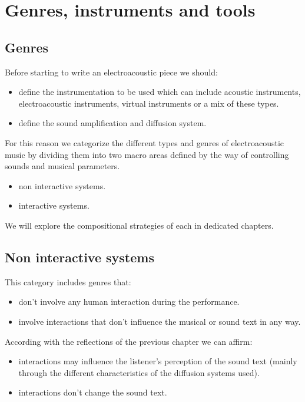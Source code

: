 \chapter{Genres, instruments and tools}

\section{Genres}\label{genres}

Before starting to write an electroacoustic piece we should:

\begin{itemize}
\tightlist\item define the instrumentation to be used which can include acoustic instruments, electroacoustic instruments, virtual instruments or a mix of these types.
\item define the sound amplification and diffusion system.
\end{itemize}

For this reason we categorize the different types and genres of electroacoustic music by dividing them into two macro areas defined by the way of controlling sounds and musical parameters.

\begin{itemize}
\tightlist\item non interactive systems.
\item interactive systems.
\end{itemize}

We will explore the compositional strategies of each in dedicated chapters.

\section{Non interactive systems}\label{non-interactive-systems}

This category includes genres that:

\begin{itemize}
\tightlist\item don't involve any human interaction during the performance.
\item involve interactions that don't influence the musical or sound text in any way.
\end{itemize}

According with the reflections of the previous chapter we can affirm:

\begin{itemize}
\tightlist\item interactions may influence the listener's perception of the sound text (mainly through the different characteristics of the diffusion systems used).
\item interactions don't change the sound text.
\end{itemize}

